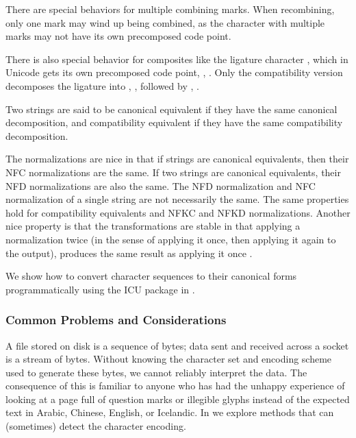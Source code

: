 There are special behaviors for multiple combining marks.  When
recombining, only one mark may wind up being combined, as the
character with multiple marks may not have its own precomposed code
point.  

There is also special behavior for composites like the ligature
character , which in Unicode gets its own precomposed
code point, , .
Only the compatibility version decomposes the ligature into
, , followed by ,
.

Two strings are said to be canonical equivalent if they have
the same canonical decomposition, and compatibility equivalent
if they have the same compatibility decomposition.  

The normalizations are nice in that if strings are canonical
equivalents, then their NFC normalizations are the same.  If two
strings are canonical equivalents, their NFD normalizations are also
the same.  The NFD normalization and NFC normalization of a single
string are not necessarily the same.  The same properties hold for
compatibility equivalents and NFKC and NFKD normalizations.  Another
nice property is that the transformations are stable in that applying
a normalization twice (in the sense of applying it once, then applying
it again to the output), produces the same result as applying it
once . 

We show how to convert character sequences to their canonical forms
programmatically using the ICU package in .

\subsubsection{Common Problems and Considerations}\label{section:char-probs}

A file stored on disk is a sequence of bytes; data sent and received
across a socket is a stream of bytes.  Without knowing the character set
and encoding scheme used to generate these bytes, we cannot reliably
interpret the data.
The consequence of this is familiar to anyone
who has had the unhappy experience of looking at
a page full of question marks or illegible glyphs
instead of the expected text in Arabic, Chinese,
English, or Icelandic.
In  we explore methods
that can (sometimes) detect the character encoding.

